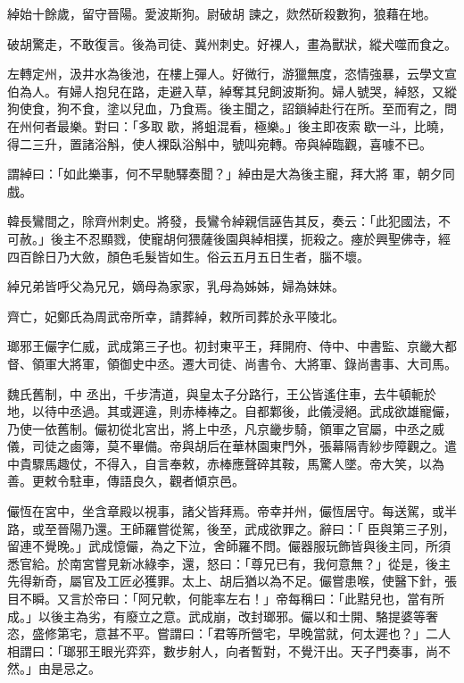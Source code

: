 \begin{pinyinscope}
 綽始十餘歲，留守晉陽。愛波斯狗。尉破胡
 諫之，欻然斫殺數狗，狼藉在地。



 破胡驚走，不敢復言。後為司徒、冀州刺史。好裸人，畫為獸狀，縱犬噬而食之。



 左轉定州，汲井水為後池，在樓上彈人。好微行，游獵無度，恣情強暴，云學文宣伯為人。有婦人抱兒在路，走避入草，綽奪其兒飼波斯狗。婦人號哭，綽怒，又縱狗使食，狗不食，塗以兒血，乃食焉。後主聞之，詔鎖綽赴行在所。至而宥之，問在州何者最樂。對曰：「多取歇，將蛆混看，極樂。」後主即夜索歇一斗，比曉，得二三升，置諸浴斛，使人裸臥浴斛中，號叫宛轉。帝與綽臨觀，喜噱不已。



 謂綽曰：「如此樂事，何不早馳驛奏聞？」綽由是大為後主寵，拜大將
 軍，朝夕同戲。



 韓長鸞間之，除齊州刺史。將發，長鸞令綽親信誣告其反，奏云：「此犯國法，不可赦。」後主不忍顯戮，使寵胡何猥薩後園與綽相撲，扼殺之。瘞於興聖佛寺，經四百餘日乃大斂，顏色毛髮皆如生。俗云五月五日生者，腦不壞。



 綽兄弟皆呼父為兄兄，嫡母為家家，乳母為姊姊，婦為妹妹。



 齊亡，妃鄭氏為周武帝所幸，請葬綽，敕所司葬於永平陵北。



 瑯邪王儼字仁威，武成第三子也。初封東平王，拜開府、侍中、中書監、京畿大都督、領軍大將軍，領御史中丞。遷大司徒、尚書令、大將軍、錄尚書事、大司馬。



 魏氏舊制，中
 丞出，千步清道，與皇太子分路行，王公皆遙住車，去牛頓軛於地，以待中丞過。其或遲違，則赤棒棒之。自都鄴後，此儀浸絕。武成欲雄寵儼，乃使一依舊制。儼初從北宮出，將上中丞，凡京畿步騎，領軍之官屬，中丞之威儀，司徒之鹵簿，莫不畢備。帝與胡后在華林園東門外，張幕隔青紗步障觀之。遣中貴驟馬趣仗，不得入，自言奉敕，赤棒應聲碎其鞍，馬驚人墜。帝大笑，以為善。更敕令駐車，傳語良久，觀者傾京邑。



 儼恆在宮中，坐含章殿以視事，諸父皆拜焉。帝幸并州，儼恆居守。每送駕，或半路，或至晉陽乃還。王師羅嘗從駕，後至，武成欲罪之。辭曰：「
 臣與第三子別，留連不覺晚。」武成憶儼，為之下泣，舍師羅不問。儼器服玩飾皆與後主同，所須悉官給。於南宮嘗見新冰綠李，還，怒曰：「尊兄已有，我何意無？」從是，後主先得新奇，屬官及工匠必獲罪。太上、胡后猶以為不足。儼嘗患喉，使醫下針，張目不瞬。又言於帝曰：「阿兄軟，何能率左右！」帝每稱曰：「此黠兒也，當有所成。」以後主為劣，有廢立之意。武成崩，改封瑯邪。儼以和士開、駱提婆等奢恣，盛修第宅，意甚不平。嘗謂曰：「君等所營宅，早晚當就，何太遲也？」二人相謂曰：「瑯邪王眼光弈弈，數步射人，向者暫對，不覺汗出。天子門奏事，尚不然。」由是忌之。




\end{pinyinscope}
